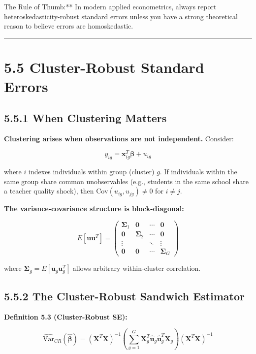 \begin{keybox}{The Rule of Thumb:** In modern applied econometrics, always report heteroskedasticity-robust standard errors unless you have a strong theoretical reason to believe errors are homoskedastic.}
\end{keybox}

\medskip\hrule\medskip

\section{5.5 Cluster-Robust Standard Errors}

\subsection{5.5.1 When Clustering Matters}

\textbf{Clustering arises when observations are not independent.} Consider:

\[
y_{ig} = \mathbf{x}_{ig}^T \boldsymbol{\beta} + u_{ig}
\]

where $i$ indexes individuals within group (cluster) $g$. If individuals within the same group share common unobservables (e.g., students in the same school share a teacher quality shock), then $\text{Cov}(u_{ig}, u_{jg}) \neq 0$ for $i \neq j$.

\textbf{The variance-covariance structure is block-diagonal:}

\[
E[\mathbf{u}\mathbf{u}^T] = \begin{pmatrix} \boldsymbol{\Sigma}_1 & \mathbf{0} & \cdots & \mathbf{0} \\ \mathbf{0} & \boldsymbol{\Sigma}_2 & \cdots & \mathbf{0} \\ \vdots & & \ddots & \vdots \\ \mathbf{0} & \mathbf{0} & \cdots & \boldsymbol{\Sigma}_G \end{pmatrix}
\]

where $\boldsymbol{\Sigma}_g = E[\mathbf{u}_g \mathbf{u}_g^T]$ allows arbitrary within-cluster correlation.

\subsection{5.5.2 The Cluster-Robust Sandwich Estimator}

\textbf{Definition 5.3 (Cluster-Robust SE):}

\[
\widehat{\text{Var}}_{CR}(\hat{\boldsymbol{\beta}}) = (\mathbf{X}^T\mathbf{X})^{-1} \left(\sum_{g=1}^G \mathbf{X}_g^T \hat{\mathbf{u}}_g \hat{\mathbf{u}}_g^T \mathbf{X}_g\right) (\mathbf{X}^T\mathbf{X})^{-1}
\]


